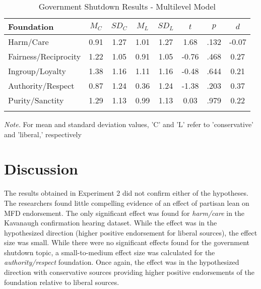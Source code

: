 \documentclass[english,,man]{apa6}
\begin{document}
\begin{table}[tbp]

\begin{center}
\begin{threeparttable}

\caption{\label{tab:exp2-tablegs}Government Shutdown Results - Multilevel Model}

\begin{tabular}{lccccccc}
\toprule
Foundation & $M_C$ & $SD_C$ & $M_L$ & $SD_L$ & $t$ & $p$ & $d$\\
\midrule
Harm/Care & 0.91 & 1.27 & 1.01 & 1.27 & 1.68 & .132 & -0.07\\
Fairness/Reciprocity & 1.22 & 1.05 & 0.91 & 1.05 & -0.76 & .468 & 0.27\\
Ingroup/Loyalty & 1.38 & 1.16 & 1.11 & 1.16 & -0.48 & .644 & 0.21\\
Authority/Respect & 0.87 & 1.24 & 0.36 & 1.24 & -1.38 & .203 & 0.37\\
Purity/Sanctity & 1.29 & 1.13 & 0.99 & 1.13 & 0.03 & .979 & 0.22\\
\bottomrule
\addlinespace
\end{tabular}

\begin{tablenotes}[para]
\normalsize{\textit{Note.} For mean and standard deviation values, 'C' and 'L' refer to 'conservative' and 'liberal,' respectively}
\end{tablenotes}

\end{threeparttable}
\end{center}

\end{table}

\hypertarget{discussion-1}{%
\section{Discussion}\label{discussion-1}}

The results obtained in Experiment 2 did not confirm either of the hypotheses. The researchers found little compelling evidence of an effect of partisan lean on MFD endorsement. The only significant effect was found for \emph{harm/care} in the Kavanaugh confirmation hearing dataset. While the effect was in the hypothesized direction (higher positive endorsement for liberal sources), the effect size was small. While there were no significant effects found for the government shutdown topic, a small-to-medium effect size was calculated for the \emph{authority/respect} foundation. Once again, the effect was in the hypothesized direction with conservative sources providing higher positive endorsements of the foundation relative to liberal sources.
\end{document}

